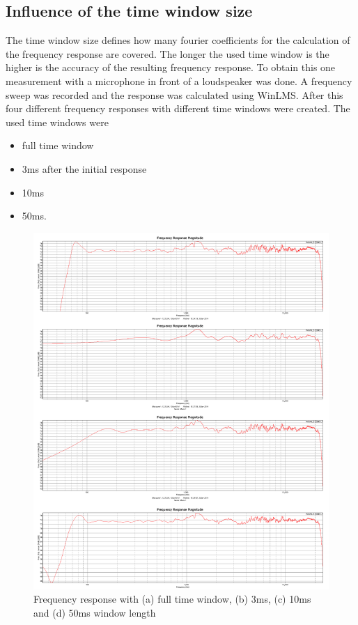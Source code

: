 \documentclass{article}
\begin{document}
\subsection{Influence of the time window size}
The time window size defines how many fourier coefficients for the calculation of the frequency response are covered. The longer the used time window is the higher is the accuracy of the resulting frequency response. To obtain this one measurement with a microphone in front of a loudspeaker was done. A frequency sweep was recorded and the response was calculated using WinLMS. After this four different frequency responses with different time windows were created. The used time windows were 
\begin{itemize}
\item full time window
\item 3ms after the initial response
\item 10ms 
\item 50ms.
\end{itemize}
\begin{figure}[htbp]
\begin{center}
\includegraphics[width=15cm,keepaspectratio=true]{Figures/TaskAcombined}
\caption{Frequency response with (a) full time window, (b) 3ms, (c) 10ms and (d) 50ms window length}
\label{fig:TaskAcombined}
\end{center}
\end{figure}
\end{document}
